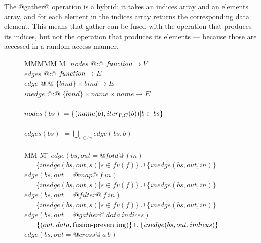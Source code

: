 The @gather@ operation is a hybrid: it takes an indices array and an elements array, and for each element in the indices array returns the corresponding data element. This means that gather can be fused with the operation that produces its indices, but not the operation that produces its elements --- because those are accessed in a random-access manner. 


\begin{figure}
\begin{tabbing}
MMMMM       \= M  \= \kill
$nodes$     \> @:@ \> $\mathit{function} \to V$              \\
$edges$     \> @:@ \> $\mathit{function} \to E$              \\
$edge$      \> @:@ \> $\{bind\} \times bind \to E$   \\
$inedge$    \> @:@ \> $\{bind\} \times name \times name \to E$   \\
\\
$nodes(bs)$ \> $= \{(name(b), \mathit{iter}_{\Gamma,C}(b)) | b \in bs\}$       \\
\\
$edges(bs)$ \> $= \bigcup_{b \in bs}edge(bs, b)$    \\
\\
MM             \= M \= \kill
$edge(bs, out = @fold@~f~in)$ \\
    \> $=$    \> $\{inedge(bs,out,s) | s \in fv(f)\} \cup \{inedge(bs, out, in) \}$       \\
$edge(bs, out = @map@~f~in)$  \\
    \> $=$    \> $\{inedge(bs,out,s) | s \in fv(f)\} \cup \{inedge(bs, out, in) \}$       \\
$edge(bs, out = @filter@~f~in)$  \\
    \> $=$    \> $\{inedge(bs,out,s) | s \in fv(f)\} \cup \{inedge(bs, out, in) \}$       \\
$edge(bs, out = @gather@~data~indices)$  \\
    \> $=$    \> $\{(out,data, \mbox{fusion-preventing}) \} \cup \{inedge(bs, out, indices) \}$       \\
$edge(bs, out = @cross@~a~b)$            \\

\end{tabbing}
\end{figure}
